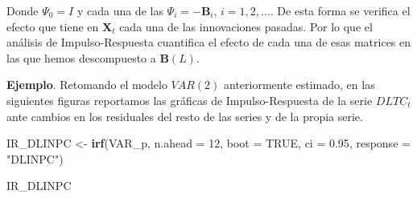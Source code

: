 \documentclass[
]{book}
\newenvironment{Shaded}{\begin{snugshade}}{\end{snugshade}}
\newcommand{\AttributeTok}[1]{\textcolor[rgb]{0.13,0.29,0.53}{#1}}
\newcommand{\ConstantTok}[1]{\textcolor[rgb]{0.56,0.35,0.01}{#1}}
\newcommand{\DecValTok}[1]{\textcolor[rgb]{0.00,0.00,0.81}{#1}}
\newcommand{\FloatTok}[1]{\textcolor[rgb]{0.00,0.00,0.81}{#1}}
\newcommand{\FunctionTok}[1]{\textcolor[rgb]{0.13,0.29,0.53}{\textbf{#1}}}
\newcommand{\NormalTok}[1]{#1}
\newcommand{\OtherTok}[1]{\textcolor[rgb]{0.56,0.35,0.01}{#1}}
\newcommand{\StringTok}[1]{\textcolor[rgb]{0.31,0.60,0.02}{#1}}
\begin{document}
Donde \(\Psi_0 = I\) y cada una de las \(\Psi_i = - \mathbf{B}_i\), \(i = 1, 2, \ldots\). De esta forma se verifica el efecto que tiene en \(\mathbf{X}_t\) cada una de las innovaciones pasadas. Por lo que el análisis de Impulso-Respuesta cuantifica el efecto de cada una de esas matrices en las que hemos descompuesto a \(\mathbf{B}(L)\).

\textbf{Ejemplo}. Retomando el modelo \(VAR(2)\) anteriormente estimado, en las siguientes figuras reportamos las gráficas de Impulso-Respuesta de la serie \(DLTC_t\) ante cambios en los residuales del resto de las series y de la propia serie.

\begin{Shaded}
\begin{Highlighting}[]
\NormalTok{IR\_DLINPC }\OtherTok{\textless{}{-}} \FunctionTok{irf}\NormalTok{(VAR\_p, }\AttributeTok{n.ahead =} \DecValTok{12}\NormalTok{, }\AttributeTok{boot =} \ConstantTok{TRUE}\NormalTok{, }
                 \AttributeTok{ci =} \FloatTok{0.95}\NormalTok{, }\AttributeTok{response =} \StringTok{"DLINPC"}\NormalTok{)}

\NormalTok{IR\_DLINPC}
\end{Highlighting}
\end{Shaded}
\end{document}
